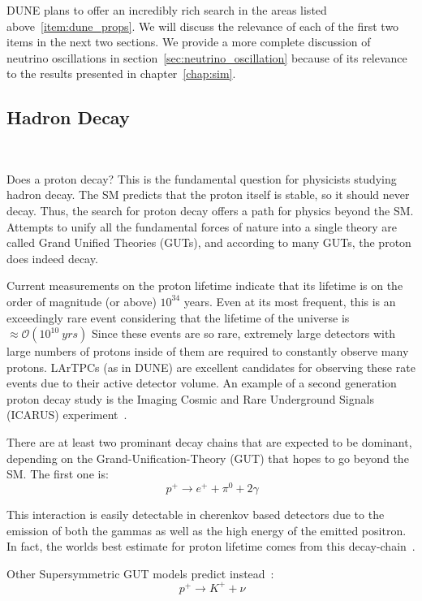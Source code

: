 DUNE plans to offer an incredibly rich search in the areas listed above~\ref{item:dune_props}.
We will discuss the relevance of each of the first two items in the next two sections.
We provide a more complete discussion of neutrino oscillations in section~\ref{sec:neutrino_oscillation} because of its relevance to the results presented in chapter~\ref{chap:sim}.


\subsection{Hadron Decay}~\label{sec:hadron_decay}

Does a proton decay?
This is the fundamental question for physicists studying hadron decay.
The SM predicts that the proton itself is stable, so it should never decay.
Thus, the search for proton decay offers a path for physics beyond the SM.
Attempts to unify all the fundamental forces of nature into a single theory are called Grand Unified Theories (GUTs), and according to many GUTs, the proton does indeed decay.

Current measurements on the proton lifetime indicate that its lifetime is on the order of magnitude (or above) $10^{34}$ years.
Even at its most frequent, this is an exceedingly rare event considering that the lifetime of the universe is $\approx \mathcal{O}(10^{10}~\unit{yrs})$
Since these events are so rare, extremely large detectors with large numbers of protons inside of them are required to constantly observe many protons.
LArTPCs (as in DUNE) are excellent candidates for observing these rate events due to their active detector volume.
An example of a second generation proton decay study is the Imaging Cosmic and Rare Underground Signals (ICARUS) experiment~\citep{ICARUS_2001}.

There are at least two prominant decay chains that are expected to be dominant, depending on the Grand-Unification-Theory (GUT) that hopes to go beyond the SM.
The first one is:
\begin{equation}~\label{eq:rxn_proton_decay1}
  p^{+} \rightarrow e^{+} + \pi^{0} + 2 \gamma
\end{equation}


This interaction is easily detectable in cherenkov based detectors due to the emission of both the gammas as well as the high energy of the emitted positron.
In fact, the worlds best estimate for proton lifetime comes from this decay-chain~\citep{PhysRevD.95.012004}.

Other Supersymmetric GUT models predict instead~\citep{PhysRevD.38.1479}:
\begin{equation}~\label{eq:rxn_proton_decay2}
  p^{+} \rightarrow K^{+} + \nu
\end{equation}

